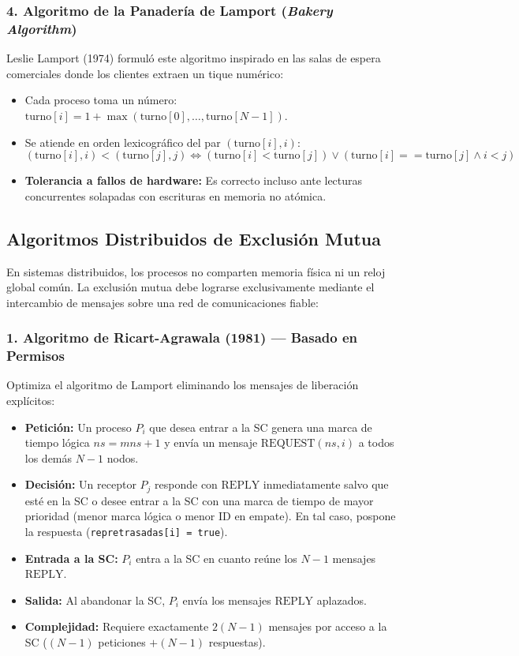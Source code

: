 \subsubsection{4. Algoritmo de la Panadería de Lamport (\textit{Bakery Algorithm})}
Leslie Lamport (1974) formuló este algoritmo inspirado en las salas de espera comerciales donde los clientes extraen un tique numérico:
\begin{itemize}[leftmargin=*]
    \item Cada proceso toma un número: $\text{turno}[i] = 1 + \max(\text{turno}[0], \dots, \text{turno}[N-1])$.
    \item Se atiende en orden lexicográfico del par $(\text{turno}[i], i)$:
    \[
    (\text{turno}[i], i) < (\text{turno}[j], j) \iff (\text{turno}[i] < \text{turno}[j]) \lor (\text{turno}[i] == \text{turno}[j] \land i < j)
    \]
    \item \textbf{Tolerancia a fallos de hardware:} Es correcto incluso ante lecturas concurrentes solapadas con escrituras en memoria no atómica.
\end{itemize}

\subsection{Algoritmos Distribuidos de Exclusión Mutua}
En sistemas distribuidos, los procesos no comparten memoria física ni un reloj global común. La exclusión mutua debe lograrse exclusivamente mediante el intercambio de mensajes sobre una red de comunicaciones fiable:

\subsubsection{1. Algoritmo de Ricart-Agrawala (1981) — Basado en Permisos}
Optimiza el algoritmo de Lamport eliminando los mensajes de liberación explícitos:
\begin{itemize}[leftmargin=*]
    \item \textbf{Petición:} Un proceso $P_i$ que desea entrar a la SC genera una marca de tiempo lógica $ns = mns + 1$ y envía un mensaje $\text{REQUEST}(ns, i)$ a todos los demás $N-1$ nodos.
    \item \textbf{Decisión:} Un receptor $P_j$ responde con $\text{REPLY}$ inmediatamente salvo que esté en la SC o desee entrar a la SC con una marca de tiempo de mayor prioridad (menor marca lógica o menor ID en empate). En tal caso, pospone la respuesta (\texttt{repretrasadas[i] = true}).
    \item \textbf{Entrada a la SC:} $P_i$ entra a la SC en cuanto reúne los $N-1$ mensajes $\text{REPLY}$.
    \item \textbf{Salida:} Al abandonar la SC, $P_i$ envía los mensajes $\text{REPLY}$ aplazados.
    \item \textbf{Complejidad:} Requiere exactamente $2(N - 1)$ mensajes por acceso a la SC ($(N-1)$ peticiones $+ (N-1)$ respuestas).
\end{itemize}

